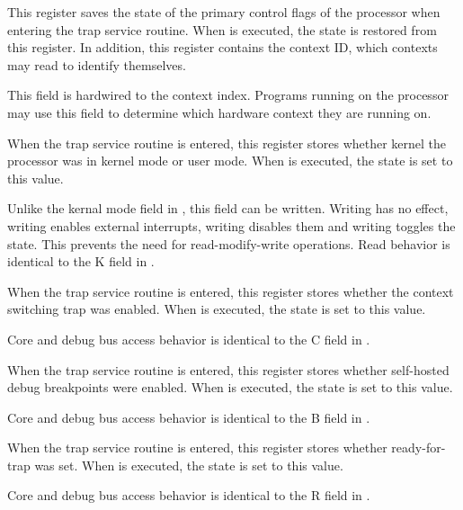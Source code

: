 
This register saves the state of the primary control flags of the processor when
entering the trap service routine. When  is executed, the state is
restored from this register. In addition, this register contains the context ID,
which contexts may read to identify themselves.

\reset{********}
This field is hardwired to the context index. Programs running on the \rvex{}
processor may use this field to determine which hardware context they are
running on.

\debugCanWrite{}
\coreCanWrite{}
When the trap service routine is entered, this register stores whether kernel
the processor was in kernel mode or user mode. When  is executed,
the state is set to this value.

Unlike the kernal mode field in , this field can be written. Writing 
 has no effect, writing  enables external interrupts, writing 
 disables them and writing  toggles the state. This prevents 
the need for read-modify-write operations. Read behavior is identical to the
K field in .

\debugCanWrite{}
\coreCanWrite{}
When the trap service routine is entered, this register stores whether the 
context switching trap was enabled. When  is executed, the state is 
set to this value.

Core and debug bus access behavior is identical to the C field in .

\debugCanWrite{}
\coreCanWrite{}
When the trap service routine is entered, this register stores whether 
self-hosted debug breakpoints were enabled. When  is executed, the 
state is set to this value.

Core and debug bus access behavior is identical to the B field in .

\debugCanWrite{}
\coreCanWrite{}
When the trap service routine is entered, this register stores whether 
ready-for-trap was set. When  is executed, the state is set to this
value.

Core and debug bus access behavior is identical to the R field in .

